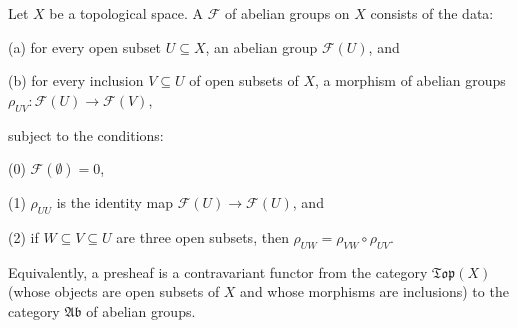 Let $X$ be a topological space. A  $\mathcal{F}$ of abelian groups on $X$ consists of the data:

(a) for every open subset $U \subseteq X$, an abelian group $\mathcal{F}(U)$, and

(b) for every inclusion $V \subseteq U$ of open subsets of $X$, a morphism of abelian groups $\rho_{UV} : \mathcal{F}(U) \rightarrow \mathcal{F}(V)$,

subject to the conditions:

(0) $\mathcal{F}(\emptyset) = 0$,

(1) $\rho_{UU}$ is the identity map $\mathcal{F}(U) \rightarrow \mathcal{F}(U)$, and

(2) if $W \subseteq V \subseteq U$ are three open subsets, then $\rho_{UW} = \rho_{VW} \circ \rho_{UV}$.

Equivalently, a presheaf is a contravariant functor from the category $\mathfrak{Top}(X)$ (whose objects are open subsets of $X$ and whose morphisms are inclusions) to the category $\mathfrak{Ab}$ of abelian groups.
